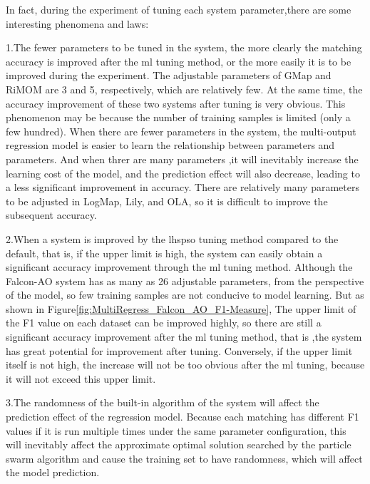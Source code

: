 \documentclass[twoside]{article}
\begin{document}
In fact, during the experiment of tuning each system parameter,there are some interesting phenomena and laws:

1.The fewer parameters to be tuned in the system, the more clearly the matching accuracy is improved after the ml tuning method, or the more easily it is to be improved during the experiment.
The adjustable parameters of GMap and RiMOM are 3 and 5, respectively, which are relatively few. At the same time, the accuracy improvement of these two systems after tuning is very obvious.
This phenomenon may be because the number of training samples is limited (only a few hundred). When there are fewer parameters in the system, the multi-output regression model is easier to learn the relationship between parameters and parameters. And when threr are many parameters ,it will inevitably increase the learning cost of the model, and the prediction effect will also decrease, leading to a less significant improvement in accuracy. There are relatively many parameters to be adjusted in LogMap, Lily, and OLA, so it is difficult to improve the subsequent accuracy.

2.When a system is improved by the lhspso tuning method compared to the default, that is, if the upper limit is high, the system can easily obtain a significant accuracy improvement through the ml tuning method.
Although the Falcon-AO system has as many as 26 adjustable parameters, from the perspective of the model, so few training samples are not conducive to model learning. But as shown in Figure\ref{fig:MultiRegress_Falcon_AO_F1-Measure}, The upper limit of the F1 value on each dataset can be improved highly, so there are still a significant accuracy improvement after the ml tuning method, that is ,the system has great potential for improvement after tuning.
Conversely, if the upper limit itself is not high, the increase will not be too obvious after the ml tuning, because it will not exceed this upper limit.

3.The randomness of the built-in algorithm of the system will affect the prediction effect of the regression model.
Because each matching has different F1 values if it is run multiple times under the same parameter configuration, this will inevitably affect the approximate optimal solution searched by the particle swarm algorithm and cause the training set to have randomness, which will affect the model prediction.
\end{document}
